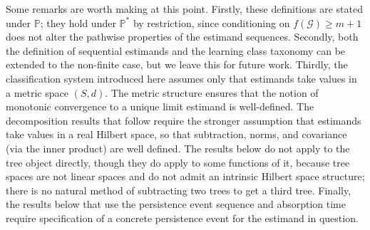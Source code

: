 \documentclass{article}
\begin{document}
Some remarks are worth making at this point. Firstly, these definitions are stated under $\mathbb{P}$; they hold under $\mathbb{P}^*$ by restriction, since conditioning on $f(\mathcal{G}) \geq m+1$ does not alter the pathwise properties of the estimand sequences. Secondly, both the definition of sequential estimands and the learning class taxonomy can be extended to the non-finite case, but we leave this for future work. Thirdly, the classification system introduced here assumes only that estimands take values in a metric space $(S,d)$. The metric structure ensures that the notion of monotonic convergence to a unique limit estimand is well-defined. The decomposition results that follow require the stronger assumption that estimands take values in a real Hilbert space, so that subtraction, norms, and covariance (via the inner product) are well defined. The results below do not apply to the tree object directly, though they do apply to some functions of it, because tree spaces are not linear spaces and do not admit an intrinsic Hilbert space structure; there is no natural method of subtracting two trees to get a third tree. Finally, the results below that use the persistence event sequence and absorption time require specification of a concrete persistence event for the estimand in question.
\end{document}
